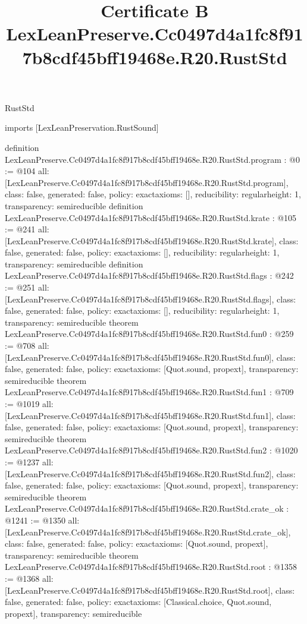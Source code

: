 \begin{lexlean}{RustStd}
\title{Certificate B LexLeanPreserve.Cc0497d4a1fc8f917b8cdf45bff19468e.R20.RustStd}
\begin{coremodule}
imports [LexLeanPreservation.RustSound]

definition LexLeanPreserve.Cc0497d4a1fc8f917b8cdf45bff19468e.R20.RustStd.program : @0 := @104 {
  all: [LexLeanPreserve.Cc0497d4a1fc8f917b8cdf45bff19468e.R20.RustStd.program],
  class: false,
  generated: false,
  policy: exact{axioms: []},
  reducibility: regular{height: 1},
  transparency: semireducible
}
definition LexLeanPreserve.Cc0497d4a1fc8f917b8cdf45bff19468e.R20.RustStd.krate : @105 := @241 {
  all: [LexLeanPreserve.Cc0497d4a1fc8f917b8cdf45bff19468e.R20.RustStd.krate],
  class: false,
  generated: false,
  policy: exact{axioms: []},
  reducibility: regular{height: 1},
  transparency: semireducible
}
definition LexLeanPreserve.Cc0497d4a1fc8f917b8cdf45bff19468e.R20.RustStd.flags : @242 := @251 {
  all: [LexLeanPreserve.Cc0497d4a1fc8f917b8cdf45bff19468e.R20.RustStd.flags],
  class: false,
  generated: false,
  policy: exact{axioms: []},
  reducibility: regular{height: 1},
  transparency: semireducible
}
theorem LexLeanPreserve.Cc0497d4a1fc8f917b8cdf45bff19468e.R20.RustStd.fun0 : @259 := @708 {
  all: [LexLeanPreserve.Cc0497d4a1fc8f917b8cdf45bff19468e.R20.RustStd.fun0],
  class: false,
  generated: false,
  policy: exact{axioms: [Quot.sound, propext]},
  transparency: semireducible
}
theorem LexLeanPreserve.Cc0497d4a1fc8f917b8cdf45bff19468e.R20.RustStd.fun1 : @709 := @1019 {
  all: [LexLeanPreserve.Cc0497d4a1fc8f917b8cdf45bff19468e.R20.RustStd.fun1],
  class: false,
  generated: false,
  policy: exact{axioms: [Quot.sound, propext]},
  transparency: semireducible
}
theorem LexLeanPreserve.Cc0497d4a1fc8f917b8cdf45bff19468e.R20.RustStd.fun2 : @1020 := @1237 {
  all: [LexLeanPreserve.Cc0497d4a1fc8f917b8cdf45bff19468e.R20.RustStd.fun2],
  class: false,
  generated: false,
  policy: exact{axioms: [Quot.sound, propext]},
  transparency: semireducible
}
theorem LexLeanPreserve.Cc0497d4a1fc8f917b8cdf45bff19468e.R20.RustStd.crate_ok : @1241 := @1350 {
  all: [LexLeanPreserve.Cc0497d4a1fc8f917b8cdf45bff19468e.R20.RustStd.crate_ok],
  class: false,
  generated: false,
  policy: exact{axioms: [Quot.sound, propext]},
  transparency: semireducible
}
theorem LexLeanPreserve.Cc0497d4a1fc8f917b8cdf45bff19468e.R20.RustStd.root : @1358 := @1368 {
  all: [LexLeanPreserve.Cc0497d4a1fc8f917b8cdf45bff19468e.R20.RustStd.root],
  class: false,
  generated: false,
  policy: exact{axioms: [Classical.choice, Quot.sound, propext]},
  transparency: semireducible
}


\end{coremodule}
\end{lexlean}
